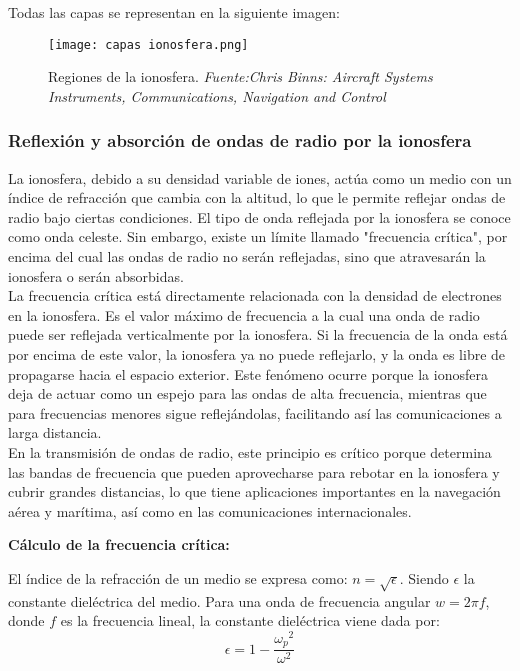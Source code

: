 Todas las capas se representan en la siguiente imagen:
\begin{figure}[H]
    \centering
    \texttt{[image: capas ionosfera.png]}
    \caption{\centering Regiones de la ionosfera. \textit{ Fuente:Chris Binns: Aircraft Systems Instruments, Communications, Navigation and Control}}
    \label{fig:mi-imagen17}
\end{figure}

\subsubsection{Reflexión y absorción de ondas de radio por la ionosfera}

La ionosfera, debido a su densidad variable de iones, actúa como un medio con un índice de refracción que cambia con la altitud, lo que le permite reflejar ondas de radio bajo ciertas condiciones. El tipo de onda reflejada por la ionosfera se conoce como onda celeste. Sin embargo, existe un límite llamado "frecuencia crítica", por encima del cual las ondas de radio no serán reflejadas, sino que atravesarán la ionosfera o serán absorbidas.\\

La frecuencia crítica está directamente relacionada con la densidad de electrones en la ionosfera. Es el valor máximo de frecuencia a la cual una onda de radio puede ser reflejada verticalmente por la ionosfera. Si la frecuencia de la onda está por encima de este valor, la ionosfera ya no puede reflejarlo, y la onda es libre de propagarse hacia el espacio exterior.  Este fenómeno ocurre porque la ionosfera deja de actuar como un espejo para las ondas de alta frecuencia, mientras que para frecuencias menores sigue reflejándolas, facilitando así las comunicaciones a larga distancia.\\

En la transmisión de ondas de radio, este principio es crítico porque determina las bandas de frecuencia que pueden aprovecharse para rebotar en la ionosfera y cubrir grandes distancias, lo que tiene aplicaciones importantes en la navegación aérea y marítima, así como en las comunicaciones internacionales.\\
\begin{nosangria}
\textbf{Cálculo de la frecuencia crítica:}\\
\end{nosangria}

El índice de la refracción de un medio se expresa como: \( n = \sqrt{\epsilon}\). Siendo \(\epsilon\) la constante dieléctrica del medio. Para una onda de frecuencia angular \(w = 2 \pi f\), donde \(f\) es la frecuencia lineal, la constante dieléctrica viene dada por:
\begin{equation}
\epsilon = 1 - \frac{{\omega_{p}}^{2}}{{\omega}^{2}}
\end{equation}

